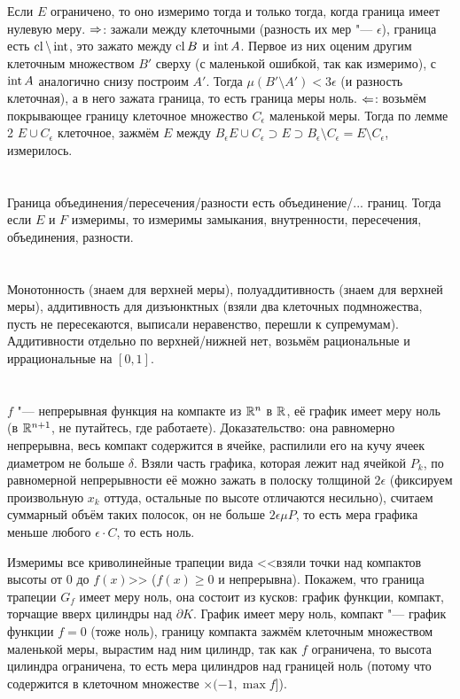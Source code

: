 \section{} %
Если $E$ ограничено, то оно измеримо тогда и только тогда, когда граница имеет нулевую меру.
$\Rightarrow$: зажали между клеточными (разность их мер "--- $\epsilon$), граница есть $\operatorname{cl} \mathbin{\backslash} \operatorname{int}$, это зажато между $\operatorname{cl} B$ и $\operatorname{int} A$.
Первое из них оценим другим клеточным множеством $B'$ сверху (с маленькой ошибкой, так как измеримо), с $\operatorname{int} A$ аналогично снизу построим $A'$.
Тогда $\mu (B' \setminus A') < 3\epsilon$ (и разность клеточная), а в него зажата граница, то есть граница меры ноль.
$\Leftarrow$: возьмём покрывающее границу клеточное множество $C_{\epsilon}$ маленькой меры.
Тогда по лемме 2 $E \cup C_{\epsilon}$ клеточное, зажмём $E$ между $B_{\epsilon} E \cup C_{\epsilon} \supset E \supset B_{\epsilon}\setminus C_{\epsilon} = E \setminus C_{\epsilon}$, измерилось.

\section{} %
Граница объединения/пересечения/разности есть объединение/... границ.
Тогда если $E$ и $F$ измеримы, то измеримы замыкания, внутренности, пересечения, объединения, разности.

\section{} %
Монотонность (знаем для верхней меры), полуаддитивность (знаем для верхней меры), аддитивность для дизъюнктных (взяли два клеточных подмножества, пусть не пересекаются, выписали неравенство, перешли к супремумам).
Аддитивности отдельно по верхней/нижней нет, возьмём рациональные и иррациональные на $[0,1]$.

\section{} %
$f$ "--- непрерывная функция на компакте из $\mathbb{R}^n$ в $\mathbb{R}$, её график имеет меру ноль (в $\mathbb{R}^{n+1}$, не путайтесь, где работаете).
Доказательство: она равномерно непрерывна, весь компакт содержится в ячейке, распилили его на кучу ячеек диаметром не больше $\delta$.
Взяли часть графика, которая лежит над ячейкой $P_k$, по равномерной непрерывности её можно зажать в полоску толщиной $2\epsilon$ (фиксируем произвольную $x_k$ оттуда, остальные по высоте отличаются несильно),
считаем суммарный объём таких полосок, он не больше $2\epsilon \mu P$, то есть мера графика меньше любого $\epsilon \cdot C$, то есть ноль.

Измеримы все криволинейные трапеции вида <<взяли точки над компактов высоты от 0 до $f(x)$>> ($f(x) \ge 0$ и непрерывна).
Покажем, что граница трапеции $G_f$ имеет меру ноль, она состоит из кусков: график функции, компакт, торчащие вверх цилиндры над $\partial K$.
График имеет меру ноль, компакт "--- график функции $f=0$ (тоже ноль), границу компакта зажмём клеточным множеством маленькой меры, вырастим над ним цилиндр,
так как $f$ ограничена, то высота цилиндра ограничена, то есть мера цилиндров над границей ноль (потому что содержится в клеточном множестве $\times (-1, \max f]$).
